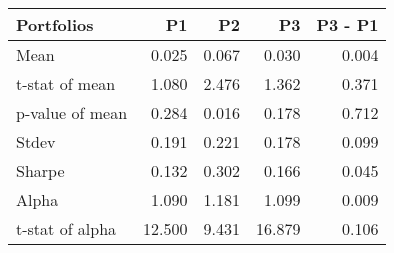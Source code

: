 \begin{tabular}{lrrrr}
\toprule
Portfolios & P1 & P2 & P3 & P3 - P1 \\
\midrule
Mean & 0.025 & 0.067 & 0.030 & 0.004 \\
t-stat of mean & 1.080 & 2.476 & 1.362 & 0.371 \\
p-value of mean & 0.284 & 0.016 & 0.178 & 0.712 \\
Stdev & 0.191 & 0.221 & 0.178 & 0.099 \\
Sharpe & 0.132 & 0.302 & 0.166 & 0.045 \\
Alpha & 1.090 & 1.181 & 1.099 & 0.009 \\
t-stat of alpha & 12.500 & 9.431 & 16.879 & 0.106 \\
\bottomrule
\end{tabular}
